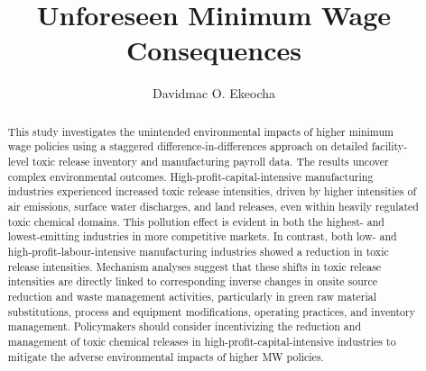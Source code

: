 \documentclass{C:/Users/david/OneDrive/Documents/ULMS/PhD/Thesis/chapter3/src/climate_change/latex/Economic_Journal/OUP-EJ}
\begin{document}
    \title[Minimum Wage and Toxic Releases]{Unforeseen Minimum Wage Consequences}
    \author[1,*]{Davidmac O. Ekeocha}
    \begin{abstract}
        \noindent This study investigates the unintended environmental impacts of higher minimum wage policies using a staggered difference-in-differences approach on detailed facility-level toxic release inventory and manufacturing payroll data. The results uncover complex environmental outcomes. High-profit-capital-intensive manufacturing industries experienced increased toxic release intensities, driven by higher intensities of air emissions, surface water discharges, and land releases, even within heavily regulated toxic chemical domains. This pollution effect is evident in both the highest- and lowest-emitting industries in more competitive markets. In contrast, both low- and high-profit-labour-intensive manufacturing industries showed a reduction in toxic release intensities. Mechanism analyses suggest that these shifts in toxic release intensities are directly linked to corresponding inverse changes in onsite source reduction and waste management activities, particularly in green raw material substitutions, process and equipment modifications, operating practices, and inventory management. Policymakers should consider incentivizing the reduction and management of toxic chemical releases in high-profit-capital-intensive industries to mitigate the adverse environmental impacts of higher MW policies.
    \end{abstract}
    \maketitle
\end{document}
